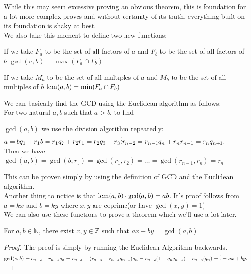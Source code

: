 While this may seem excessive proving an obvious theorem, this is foundation for a lot more complex proves and without certainty of its truth, everything built on its foundation is shaky at best.\\
We also take this moment to define two new functions:\\
\begin{definition}
If we take $F_a$ to be the set of all factors of $a$ and $F_b$ to be the set of all factors of $b$
    $\gcd(a,b)= \max( F_a \cap F_b)$
\end{definition}
\begin{definition}
If we take $M_a$ to be the set of all multiples of $a$ and $M_b$ to be the set of all multiples of $b$
    $\operatorname*{lcm}(a,b)= \min( F_a \cap F_b)$
\end{definition}
We can basically find the GCD using the Euclidean algorithm as follows:\\
For two natural $a, b$ such that $a > b$, to find
\begin{theorem}
$\gcd(a, b)$ we use the division algorithm repeatedly:\\
$a = bq_1 + r_1\\
b = r_1q_2 + r_2\\
r_1 = r_2q_3 + r_3\\
\vdots\\
r_{n-2} = r_{n-1}q_n + r_n\\
r_{n-1} = r_nq_{n+1}.$\\
Then we have $\gcd(a, b) = \gcd(b, r_1) = \gcd(r_1, r_2) = \dots = \gcd(r_{n-1}, r_n) = r_n$\\
\end{theorem}
This can be proven simply by using the definition of GCD and the Euclidean algorithm.\\
Another thing to notice is that $\operatorname*{lcm}(a,b)\cdot \gcd(a,b)=ab$. It's proof follows from $a=kx$ and $b=ky$ where $x,y$ are coprime(or have $\gcd(x,y)=1$)\\
We can also use these functions to prove a theorem which we'll use a lot later.\\
\begin{theorem}
    For $a, b \in \mathbb{N}$, there exist $x, y \in \mathbb{Z}$ such that $ax + by = \gcd(a, b)$
\end{theorem}
\begin{proof}
    The proof is simply by running the Euclidean Algorithm backwards.
    $\gcd(a, b) = r_{n-2} - r_{n-1}q_n\\
    = r_{n-2} - (r_{n-3} - r_{n-2}q_{n-1})q_n\\
    = r_{n-2}(1 + q_nq_{n-1}) - r_{n-3} (q_n)\\
    = \vdots\\
    = ax + by.$\\
\end{proof}
